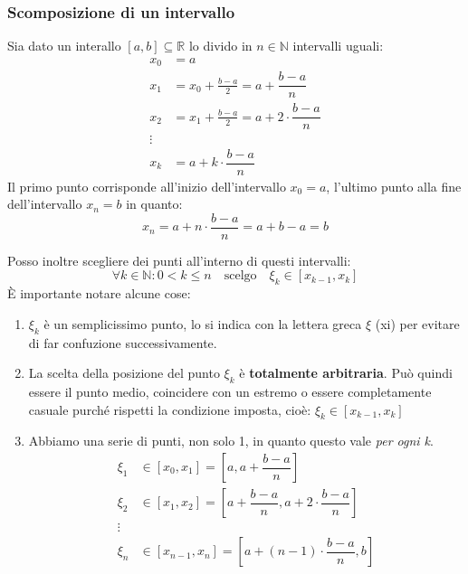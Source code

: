 \subsubsection{Scomposizione di un intervallo}
Sia dato un interallo $[a,b] \subseteq \mathbb{R}$ lo divido in $n \in \mathbb{N}$ intervalli uguali:
\begin{align*}
	x_0 &= a\\
	x_1 &= x_0 + \frac{b-a}{2} = a + \dfrac{b-a}{n}\\
	x_2 &= x_1 + \frac{b-a}{2} = a + 2 \cdot \dfrac{b-a}{n}\\
	\vdots\\
	x_k &= a + k \cdot \dfrac{b-a}{n}
\end{align*}
Il primo punto corrisponde all'inizio dell'intervallo $x_0 = a$, l'ultimo punto alla fine dell'intervallo $x_n = b$ in quanto:
\begin{equation*}
	x_n = a + n \cdot \dfrac{b-a}{n} = a + b - a = b
\end{equation*}

Posso inoltre scegliere dei punti all'interno di questi intervalli: 
\begin{equation*}
	\forall k \in \mathbb{N} : 0 < k \leq n \quad \text{scelgo} \quad \xi_k \in [x_{k-1}, x_k]
\end{equation*}
È importante notare alcune cose:
\begin{enumerate}
	\item $\xi_k$ è un semplicissimo punto, lo si indica con la lettera greca $\xi$ (xi) per evitare di far confuzione successivamente.

	\item La scelta della posizione del punto $\xi_k$ è \textbf{totalmente arbitraria}. Può quindi essere il punto medio, coincidere con un estremo o essere completamente casuale purché rispetti la condizione imposta, cioè: $\xi_k \in [x_{k-1}, x_k]$

	\item Abbiamo una serie di punti, non solo 1, in quanto questo vale \textit{per ogni k}.
	\begin{align*}
		\xi_1 &\in [x_0, x_1] = \left[a, a + \dfrac{b-a}{n} \right]\\
		\xi_2 &\in [x_1, x_2] = \left[a + \dfrac{b-a}{n}, a + 2 \cdot \dfrac{b-a}{n} \right]\\
		\vdots\\
		\xi_n &\in [x_{n-1}, x_n] = \left[a + (n-1) \cdot \dfrac{b-a}{n}, b \right]
	\end{align*}

\end{enumerate}

